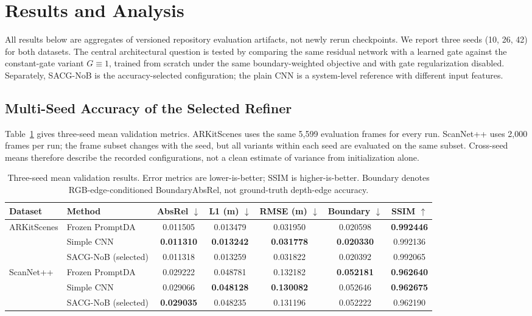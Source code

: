 \section{Results and Analysis}
\label{sec:results}
All results below are aggregates of versioned repository evaluation artifacts, not newly rerun checkpoints. We report three seeds (10, 26, 42) for both datasets. The central architectural question is tested by comparing the same residual network with a learned gate against the constant-gate variant $G\equiv1$, trained from scratch under the same boundary-weighted objective and with gate regularization disabled. Separately, SACG-NoB is the accuracy-selected configuration; the plain CNN is a system-level reference with different input features.

\subsection{Multi-Seed Accuracy of the Selected Refiner}
Table~\ref{tab:main_results} gives three-seed mean validation metrics. ARKitScenes uses the same 5,599 evaluation frames for every run. ScanNet++ uses 2,000 frames per run; the frame subset changes with the seed, but all variants within each seed are evaluated on the same subset. Cross-seed means therefore describe the recorded configurations, not a clean estimate of variance from initialization alone.

\begin{table}[t]
\caption{Three-seed mean validation results. Error metrics are lower-is-better; SSIM is higher-is-better. Boundary denotes RGB-edge-conditioned BoundaryAbsRel, not ground-truth depth-edge accuracy.}
\label{tab:main_results}
\centering\small
\begin{tabular}{llccccc}
\toprule
Dataset & Method & AbsRel $\downarrow$ & L1 (m) $\downarrow$ & RMSE (m) $\downarrow$ & Boundary $\downarrow$ & SSIM $\uparrow$\\
\midrule
ARKitScenes & Frozen PromptDA & 0.011505 & 0.013479 & 0.031950 & 0.020598 & \textbf{0.992446}\\
& Simple CNN & \textbf{0.011310} & \textbf{0.013242} & \textbf{0.031778} & \textbf{0.020330} & 0.992136\\
& SACG-NoB (selected) & 0.011318 & 0.013259 & 0.031822 & 0.020392 & 0.992065\\
\midrule
ScanNet++ & Frozen PromptDA & 0.029222 & 0.048781 & 0.132182 & \textbf{0.052181} & \textbf{0.962640}\\
& Simple CNN & 0.029066 & \textbf{0.048128} & \textbf{0.130082} & 0.052646 & \textbf{0.962675}\\
& SACG-NoB (selected) & \textbf{0.029035} & 0.048235 & 0.131196 & 0.052222 & 0.962190\\
\bottomrule
\end{tabular}
\end{table}

